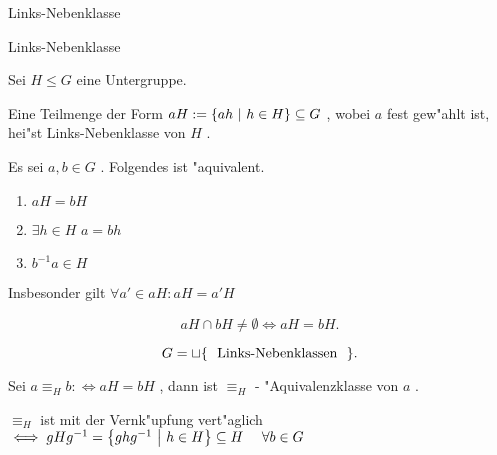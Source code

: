 \documentclass[class=article, crop=false]{standalone}
\begin{document}
\begin{zettel}{Links-Nebenklasse}
\begin{flashcard}[ipuiwijn]{Links-Nebenklasse}
	\begin{definition}
		Sei $H \leq G$ eine Untergruppe.

		Eine Teilmenge der Form $aH := \set{ah}{h \in  H} \subseteq G$ , wobei $a$ fest gew"ahlt ist, hei"st Links-Nebenklasse von $H$ .
	\end{definition}
\end{flashcard}

\begin{lemma}
	Es sei $a,b \in  G$ . Folgendes ist "aquivalent.
	\begin{enumerate}
		\item $aH =  bH$
		\item $\exists  h \in  H$  $a =  bh$
		\item $b^{-1} a \in  H$
	\end{enumerate}
	Insbesonder gilt $\forall a' \in  aH : aH =  a'H$
\end{lemma}

\begin{corollary}
	\[
		aH \cap bH \neq  \emptyset \iff  aH =  bH
	.\]
\end{corollary}

\begin{corollary}
	\[
		G =  \sqcup \set{\tx{ Links-Nebenklassen } }
	.\]
\end{corollary}

Sei $a \equiv_H b :\iff aH = bH$ , dann ist $\equiv_H$ - "Aquivalenzklasse von $a$ .

\begin{theorem}
	$\equiv_H$ ist mit der Vernk"upfung vert"aglich $\iff gHg^{-1} = \set{ghg^{-1} }{h \in  H} \subseteq H \quad \forall b \in  G$
\end{theorem}

\end{zettel}
\end{document}
